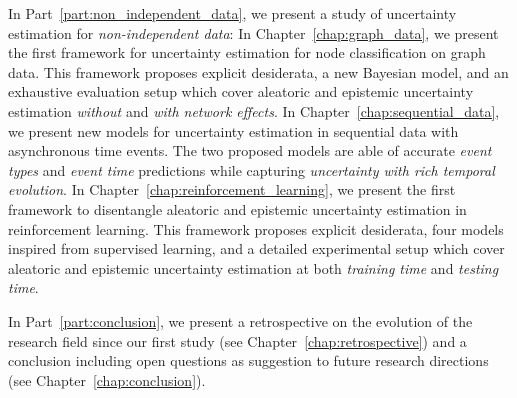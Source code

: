 In Part~\ref{part:non_independent_data}, we present a study of uncertainty estimation for \emph{non-independent data}:
In Chapter~\ref{chap:graph_data}, we present the first framework for uncertainty estimation for node classification on graph data. This framework proposes explicit desiderata, a new Bayesian model, and an exhaustive evaluation setup which cover aleatoric and epistemic uncertainty estimation \emph{without} and \emph{with network effects}.
In Chapter~\ref{chap:sequential_data}, we present new models for uncertainty estimation in sequential data with asynchronous time events. The two proposed models are able of accurate \emph{event types} and \emph{event time} predictions while capturing \emph{uncertainty with rich temporal evolution}.
In Chapter~\ref{chap:reinforcement_learning}, we present the first framework to disentangle aleatoric and epistemic uncertainty estimation in reinforcement learning. This framework proposes explicit desiderata, four models inspired from supervised learning, and a detailed experimental setup which cover aleatoric and epistemic uncertainty estimation at both \emph{training time} and \emph{testing time}.

In Part~\ref{part:conclusion}, we present a retrospective on the evolution of the research field since our first study (see Chapter~\ref{chap:retrospective}) and a conclusion including open questions as suggestion to future research directions (see Chapter~\ref{chap:conclusion}).

